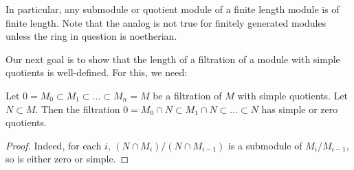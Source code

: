 \begin{exercise} 
In particular, any submodule or quotient module of a finite length module is
of finite length. Note that the analog is not true for finitely generated
modules unless the ring in question is noetherian.
\end{exercise} 

Our next goal is to show that the length of a filtration of a module with
simple quotients is well-defined.
For this, we need:
\begin{lemma}  \label{simplefiltrationint}
Let $0 = M_0 \subset M_1 \subset \dots \subset M_n = M$ be  a filtration of
$M$ with simple quotients. Let $N \subset M$. Then the filtration
$0 = M_0 \cap N \subset M_1 \cap N \subset \dots \subset N$ has simple or zero
quotients. 
\end{lemma} 
\begin{proof} 
Indeed, for each $i$, $(N \cap M_i)/(N \cap M_{i-1})$ is a submodule of
$M_i / M_{i-1}$, so is either zero or simple.
\end{proof} 


